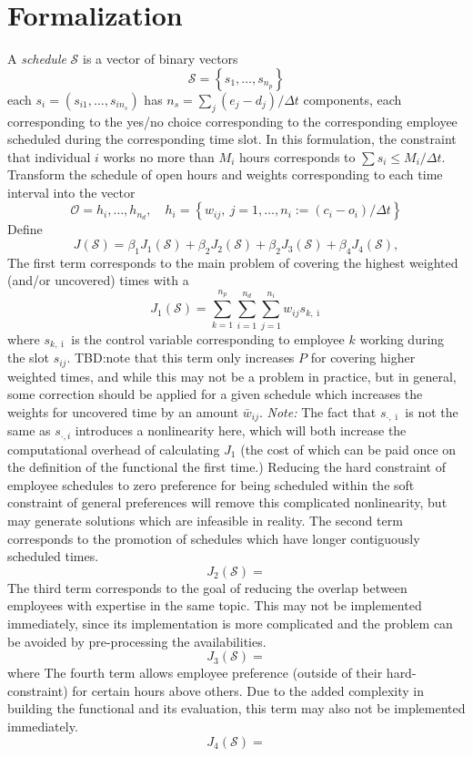 \documentclass[11pt, draft]{amsart}
\newcommand{\bk}[1]{\left\{#1\right\}}
\def\S{\mathcal{S}}
\begin{document}
\section{Formalization}
A \emph{schedule} $\S$ is a vector of binary vectors
\[
  \S = \bk{s_1, \ldots, s_{n_p}}
\]
each $s_i = (s_{i1},\ldots,s_{in_s})$ has $n_s = \sum_j (e_j - d_j) / {\Delta t}$ components, each corresponding
to the yes/no choice corresponding to the corresponding employee scheduled
during the corresponding time slot.
In this formulation, the constraint that individual $i$ works no more than $M_i$
hours corresponds to $\sum s_i \leq M_i / {\Delta t}$.
Transform the schedule of open hours and weights corresponding to each time interval into the vector
\[
  \mathcal{O} = {h_i, \ldots, h_{n_d}},
  \quad h_i = \bk{w_{ij},~j=1,\ldots, n_i := (c_i - o_i)/{\Delta t}}
\]
Define
\[
  J(\S) = \beta_1 J_1(\S) + \beta_2 J_2(\S) + \beta_2 J_3(\S) + \beta_4 J_4(\S),
\]
The first term corresponds to the main problem of covering the highest weighted (and/or uncovered) times with a
\[
  J_1(\S) = \sum_{k=1}^{n_p} \sum_{i=1}^{n_d} \sum_{j=1}^{n_i}w_{ij} s_{k,\bar{\imath}}
\]
where $s_{k,\bar{\imath}}$ is the control variable corresponding to employee $k$
working during the slot $s_{ij}$.
TBD:\@ note that this term only increases $P$ for covering higher weighted times, and while this may not be a problem in practice, but in general, some correction should be applied for a given schedule which increases the weights for uncovered time by an amount $\bar{w}_{ij}$.
\emph{Note:} The fact that $s_{\cdot,\bar{\imath}}$ is not the same as $s_{\cdot,i}$ introduces a nonlinearity here, which will both increase the computational overhead of calculating $J_1$ (the cost of which can be paid once on the definition of the functional the first time.)
Reducing the hard constraint of employee schedules to zero preference for being scheduled within the soft constraint of general preferences will remove this complicated nonlinearity, but may generate solutions which are infeasible in reality.
%
The second term corresponds to the promotion of schedules which have longer contiguously scheduled times.
\[
  J_2(\S) =
\]
%
The third term corresponds to the goal of reducing the overlap between employees with expertise in the same topic.
This may not be implemented immediately, since its implementation is more complicated and the problem can be avoided by pre-processing the availabilities.
\[
  J_3(\S) =
\]
where
%
The fourth term allows employee preference (outside of their hard-constraint) for certain hours above others.
Due to the added complexity in building the functional and its evaluation, this term may also not be implemented immediately.
\[
  J_4(\S) =
\]
\end{document}
